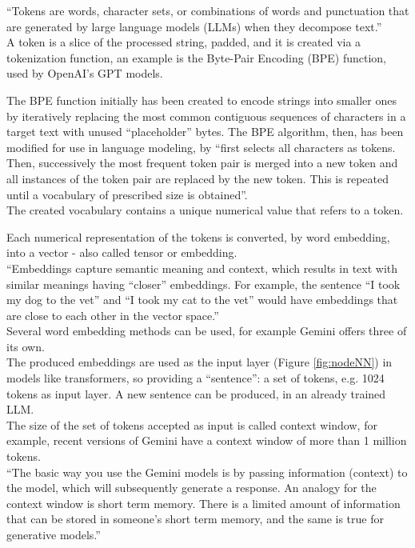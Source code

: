 \documentclass[12pt]{article}
\begin{document}
\vspace{2mm}

``Tokens are words, character sets, or combinations of words and punctuation that are generated by large language models (LLMs) when they decompose text.''\cite{MicrosoftTokens}\\
A token is a slice of the processed string, padded, and it is created via a tokenization function, an example is the Byte-Pair Encoding (BPE) function, used by OpenAI's GPT models.

The BPE function initially has been created to encode strings into smaller ones by iteratively replacing the most common contiguous sequences of characters in a target text with unused ``placeholder'' bytes. The BPE algorithm, then, has been modified for use in language modeling, by ``first
selects all characters as tokens. Then, successively the most frequent token pair is
merged into a new token and all instances of the token pair are replaced by the
new token. This is repeated until a vocabulary of prescribed size is obtained''.\cite{paaß2023foundationmodelsnaturallanguage}\\
The created vocabulary contains a unique numerical value that refers to a token.\\

\vspace{2mm}

Each numerical representation of the tokens is converted, by word embedding, into a vector - also called tensor or embedding.\\
``Embeddings capture semantic meaning and context, which results in text with similar meanings having ``closer'' embeddings. For example, the sentence ``I took my dog to the vet'' and ``I took my cat to the vet'' would have embeddings that are close to each other in the vector space.''\cite{GoogleEmbeddings}\\
Several word embedding methods can be used, for example Gemini offers three of its own.\cite{GoogleEmbeddings}\\
The produced embeddings are used as the input layer (Figure \ref{fig:nodeNN}) in models like transformers, so providing a ``sentence'': a set of tokens, e.g. 1024 tokens as input layer. A new sentence can be produced, in an already trained LLM.\\ 
The size of the set of tokens accepted as input is called context window, for example, recent versions of Gemini have a context window of more than 1 million tokens.\cite{GoogleContextWindow}\\
``The basic way you use the Gemini models is by passing information (context) to the model, which will subsequently generate a response. An analogy for the context window is short term memory. There is a limited amount of information that can be stored in someone's short term memory, and the same is true for generative models.''\cite{GoogleContextWindow}\\
\end{document}
